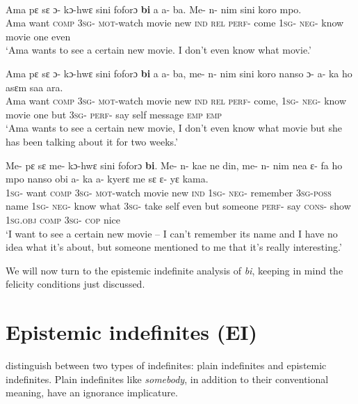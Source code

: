 \documentclass[output=paper,modfonts,nonflat,draftmode]{langsci/langscibook}
\begin{document}
\pagebreak
\ea
{}\\
\ea\label{owusu:ex20}
\gll Ama pε sε ɔ- kɔ-hwε sini foforɔ \textbf{bi} a a- ba. Me- n- nim sini koro mpo.\\
Ama want \textsc{comp} \textsc{3sg}- \textsc{mot}-watch movie new \textsc{ind} \textsc{rel} \textsc{perf}- come \textsc{1sg}- \textsc{neg}- know movie one even \\
\glt `Ama wants to see a certain new movie. I don't even know what movie.'

\ex\label{owusu:ex21}
 \gll Ama pε sε ɔ- kɔ-hwε sini foforɔ \textbf{bi} a a- ba, me- n- nim sini koro nanso ɔ- a- ka ho asεm saa ara.\\
Ama want \textsc{comp} \textsc{3sg}- \textsc{mot}-watch movie new \textsc{ind} \textsc{rel} \textsc{perf}- come, \textsc{1sg}- \textsc{neg}- know movie one but \textsc{3sg}- \textsc{perf}- say self message \textsc{emp} \textsc{emp} \\
\glt `Ama wants to see a certain new movie, I don't even know what movie but she has been talking about it for two weeks.'

\ex\label{owusu:ex20a}
\gll Me- pε sε me- kɔ-hwε sini foforɔ \textbf{bi}. Me- n- kae ne din, me- n- nim nea ε- fa ho mpo nanso obi a- ka a- kyerε me sε ε- yε kama.\\
\textsc{1sg}- want \textsc{comp} \textsc{3sg}- \textsc{mot}-watch movie new \textsc{ind} \textsc{1sg}- \textsc{neg}- remember \textsc{3sg}-\textsc{poss} name \textsc{1sg}- \textsc{neg}- know what \textsc{3sg}- take self even but someone \textsc{perf}- say \textsc{cons}- show \textsc{1sg}.\textsc{obj} \textsc{comp} \textsc{3sg}- \textsc{cop} nice\\
\glt `I want to see a certain new movie – I can’t remember its name and I have no idea what it’s about, but someone mentioned to me that it’s really interesting.'
\z\z

We will now turn to the epistemic indefinite analysis of \emph{bi}, keeping in mind the felicity conditions just discussed.

\section{Epistemic indefinites (EI)}\label{sec:owusu:3}

\citet{AloniPort2015} distinguish between two types of indefinites: plain indefinites and epistemic indefinites. Plain indefinites like \emph{somebody}, in addition to their conventional meaning, have an ignorance implicature.\largerpage
\end{document}
